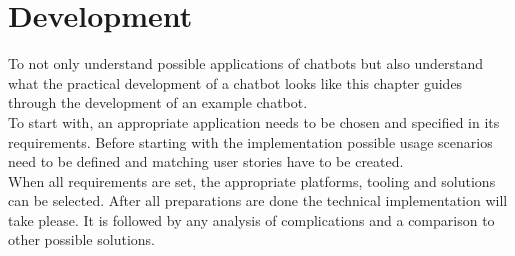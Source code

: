 \chapter{Development}


To not only understand possible applications of chatbots but also understand what the practical development of a chatbot looks like this chapter guides through the development of an example chatbot.
\\

To start with, an appropriate application needs to be chosen and specified in its requirements.
Before starting with the implementation possible usage scenarios need to be defined and matching user stories have to be created.
\\
When all requirements are set, the appropriate platforms, tooling and solutions can be selected.
After all preparations are done the technical implementation will take please.
It is followed by any analysis of complications and a comparison to other possible solutions.


